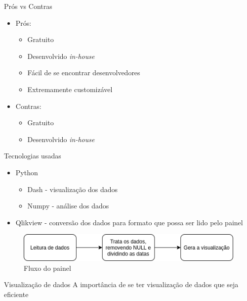 \documentclass[10pt,t]{beamer}
\begin{document}
\begin{frame}{Prós vs Contras}
	\vspace{8pt}
	\begin{itemize}
		\item Prós: 
		\begin{itemize}
			\item Gratuito
			\item Desenvolvido \textit{in-house}
			\item Fácil de se encontrar desenvolvedores
			\item Extremamente customizável
		\end{itemize}
	    \item Contras:
	    \begin{itemize}
	    	\item Gratuito %
	    	\item Desenvolvido \textit{in-house} %
	    \end{itemize}
	\end{itemize}
\end{frame}

\begin{frame}{Tecnologias usadas}
\vspace{8pt}
    \begin{itemize}
        \item Python
        \begin{itemize}
            \item Dash - visualização dos dados
            \item Numpy - análise dos dados
        \end{itemize}
        \item Qlikview - conversão dos dados para formato que possa ser lido pelo painel
    \end{itemize}
	\begin{figure}
		\centering
		\includegraphics[scale=0.60]{./imagens/fluxo_painel.png}
		\caption{Fluxo do painel}
	\end{figure}
\end{frame}



\begin{frame}{Visualização de dados}
	\vspace{8pt}
	A importância de se ter visualização de dados que seja eficiente
\end{frame}
\end{document}
